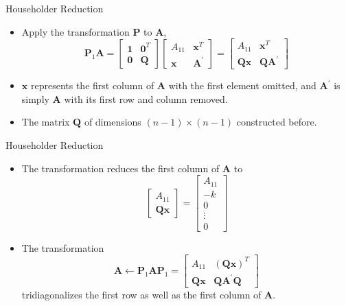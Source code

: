 \documentclass{beamer}
\begin{document}
\begin{frame}{Householder Reduction}
    \begin{itemize}
\item Apply the transformation $\mathbf{P}$ to $\mathbf{A}$,
\[
\mathbf{P}_1 \mathbf{A}=\left[\begin{array}{ll}
\mathbf{1} & \mathbf{0}^T \\
\mathbf{0} & \mathbf{Q}
\end{array}\right]\left[\begin{array}{cc}
A_{11} & \mathbf{x}^T \\
\mathbf{x} & \mathbf{A}^{\prime}
\end{array}\right]=\left[\begin{array}{cc}
A_{11} & \mathbf{x}^T \\
\mathbf{Q x} & \mathbf{Q A}^{\prime}
\end{array}\right]
\]
\item $\mathbf{x}$ represents the first column of $\mathbf{A}$ with the first element omitted, and $\mathbf{A}^{\prime}$ is simply $\mathbf{A}$ with its first row and column removed. 
\item The matrix $\mathbf{Q}$ of dimensions $(n-1) \times (n-1)$ constructed before.
\end{itemize}
\end{frame}
\begin{frame}{Householder Reduction}
    \begin{itemize}
        \item The transformation reduces the first column of $\mathbf{A}$ to
\[
\left[\begin{array}{c}
A_{11} \\
\mathbf{Q x}
\end{array}\right]=\left[\begin{array}{c}
A_{11} \\
-k \\
0 \\
\vdots \\
0
\end{array}\right]
\]
\item The transformation 
$$
\mathbf{A} \leftarrow \mathbf{P}_1 \mathbf{A} \mathbf{P}_1=\left[\begin{array}{cc}
A_{11} & (\mathbf{Q x})^T \\
\mathbf{Q x} & \mathbf{Q A}^{\prime} \mathbf{Q}
\end{array}\right]
$$
tridiagonalizes the first row as well as the first column of $\mathbf{A}$.
\end{itemize}
\end{frame}
\end{document}

